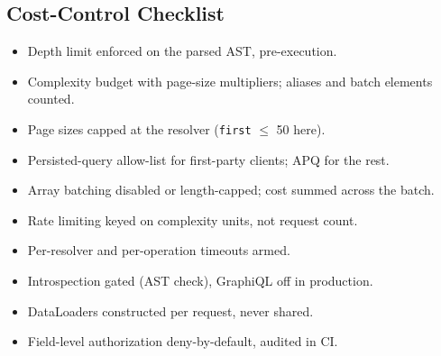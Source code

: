 \subsection{Cost-Control Checklist}

\begin{itemize}
  \item[$\square$] Depth limit enforced on the parsed AST, pre-execution.
  \item[$\square$] Complexity budget with page-size multipliers; aliases
        and batch elements counted.
  \item[$\square$] Page sizes capped at the resolver (\texttt{first}
        $\le$ 50 here).
  \item[$\square$] Persisted-query allow-list for first-party clients;
        APQ for the rest.
  \item[$\square$] Array batching disabled or length-capped; cost summed
        across the batch.
  \item[$\square$] Rate limiting keyed on complexity units, not request
        count.
  \item[$\square$] Per-resolver and per-operation timeouts armed.
  \item[$\square$] Introspection gated (AST check), GraphiQL off in
        production.
  \item[$\square$] DataLoaders constructed per request, never shared.
  \item[$\square$] Field-level authorization deny-by-default, audited in
        CI.
\end{itemize}


